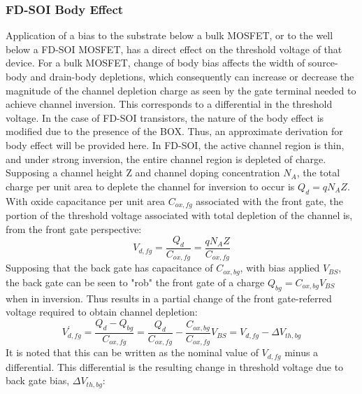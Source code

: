 	\subsubsection{FD-SOI Body Effect}
	Application of a bias to the substrate below a bulk MOSFET, or to the well below a FD-SOI MOSFET, has a direct effect on the threshold voltage of that device. For a bulk MOSFET, change of body bias affects the width of source-body and drain-body depletions, which consequently can increase or decrease the magnitude of the channel depletion charge as seen by the gate terminal needed to achieve channel inversion. This corresponds to a differential in the threshold voltage. %
	In the case of FD-SOI transistors, the nature of the body effect is modified due to the presence of the BOX. Thus, an approximate derivation for body effect will be provided here. In FD-SOI, the active channel region is thin, and under strong inversion, the entire channel region is depleted of charge. Supposing a channel height Z and channel doping concentration $N_A$, the total charge per unit area to deplete the channel for inversion to occur is $Q_{d} = qN_AZ$. With oxide capacitance per unit area $C_{ox,fg}$ associated with the front gate, the portion of the threshold voltage associated with total depletion of the channel is, from the front gate perspective:
	\begin{equation}
		V_{d,fg} = \frac{Q_d}{C_{ox,fg}} = \frac{qN_AZ}{C_{ox,fg}} 
	\end{equation}
	Supposing that the back gate has capacitance of $C_{ox,bg}$, with bias applied $V_{BS}$, the back gate can be seen to "rob" the front gate of a charge $Q_{bg} = C_{ox,bg}V_{BS}$ when in inversion. Thus results in a partial change of the front gate-referred voltage required to obtain channel depletion:
	\begin{equation}
		V_{d,fg}^{'} = \frac{Q_d-Q_{bg}}{C_{ox,fg}} = \frac{Q_d}{C_{ox,fg}} - \frac{C_{ox,bg}}{C_{ox,fg}}V_{BS} = V_{d,fg}-\Delta V_{th,bg}
	\end{equation}
	It is noted that this can be written as the nominal value of $V_{d,fg}$ minus a differential. This differential is the resulting change in threshold voltage due to back gate bias, $\Delta V_{th,bg}$:
